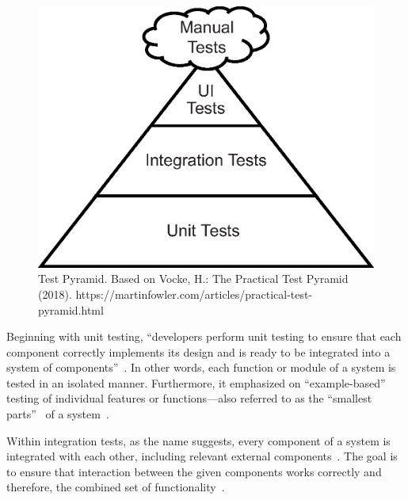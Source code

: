 \documentclass[runningheads]{llncs}
\begin{document}
\begin{figure}
  \centering
  \includegraphics[width=.618\textwidth]{includes/test_pyramid.eps}
  \caption{Test Pyramid. Based on Vocke, H.: The Practical Test Pyramid (2018). https://martinfowler.com/articles/practical-test-pyramid.html}
  \label{fig:test_pyramid}
\end{figure}

Beginning with unit testing, ``developers perform unit testing to ensure that each component correctly implements its design and is ready to be integrated into a system of components''~\cite{Hartmann2000}. In other words, each function or module of a system is tested in an isolated manner. Furthermore, it emphasized on ``example-based''~\cite{Corgozinho2023} testing of individual features or functions---also referred to as the ``smallest parts''~\cite{Aniche2022} of a system~\cite{Hartmann2000,Corgozinho2023}.

Within integration tests, as the name suggests, every component of a system is integrated with each other, including relevant external components~\cite{Aniche2022,Hartmann2000,Radziwill2020}. The goal is to ensure that interaction between the given components works correctly and therefore, the combined set of functionality~\cite{Hartmann2000,Aniche2022}.
\end{document}
